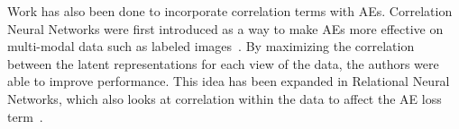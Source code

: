 Work has also been done to incorporate correlation terms with AEs.
Correlation Neural Networks were first introduced as a way to make AEs more effective on multi-modal data such as labeled images~\cite{chandar2016correlational}.
By maximizing the correlation between the latent representations for each view of the data, the authors were able to improve performance.
This idea has been expanded in Relational Neural Networks, which also looks at correlation within the data to affect the AE loss term~\cite{meng2017relational}.